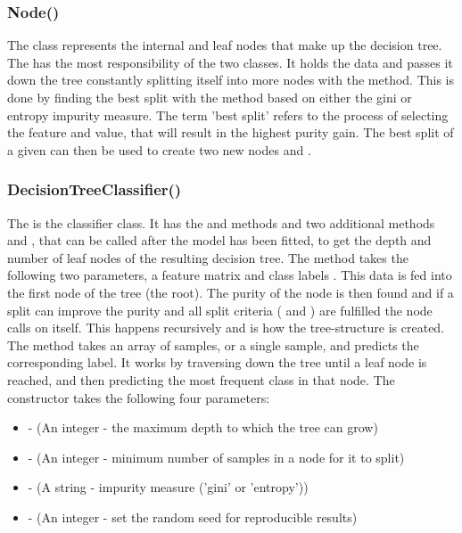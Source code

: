 \subsubsection{Node()}
The  class represents the internal and leaf nodes that make up the decision tree.
The  has the most responsibility of the two classes.
It holds the data and passes it down the tree constantly splitting itself into more nodes with the  method.
This is done by finding the best split with the  method based on either the gini or entropy impurity measure.
The term 'best split' refers to the process of selecting the feature and value, that will result in the highest purity gain.
The best split of a given  can then be used to create two new nodes  and .


\subsubsection{DecisionTreeClassifier()}
The  is the classifier class.
It has the  and  methods and two additional  methods  and , that can be called after the model has been fitted, to get the depth and number of leaf nodes of the resulting decision tree.
The  method takes the following two parameters, a feature matrix  and class labels .
This data is fed into the first node of the tree (the root).
The purity of the node is then found and if a split can improve the purity and all split criteria ( and ) are fulfilled the node calls  on itself.
This happens recursively and is how the tree-structure is created.
The  method takes an array of samples, or a single sample, and predicts the corresponding label.
It works by traversing down the tree until a leaf node is reached, and then predicting the most frequent class in that node.
The constructor takes the following four parameters:\\
\begin{itemize}
    \item {} - (An integer - the maximum depth to which the tree can grow)
    \item {} - (An integer - minimum number of samples in a node for it to split)
    \item {} - (A string - impurity measure ('gini' or 'entropy'))
    \item {} - (An integer - set the random seed for reproducible results)
    \end{itemize}
\vspace{10pt}

